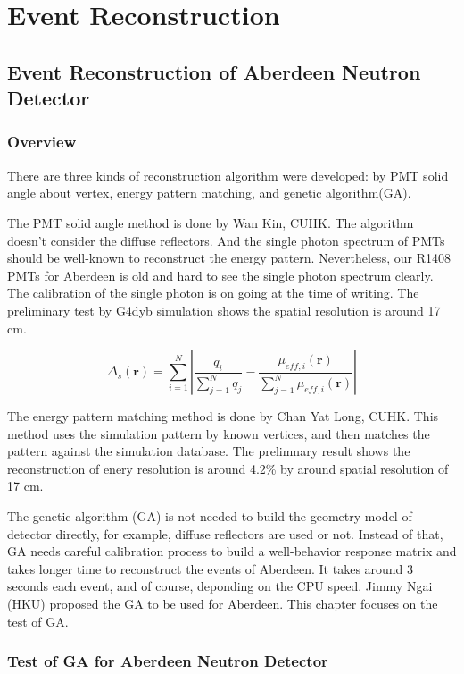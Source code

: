 \chapter {Event Reconstruction}
\section {Event Reconstruction of Aberdeen Neutron Detector}
\subsection {Overview}
There are three kinds of reconstruction algorithm were developed: by PMT solid angle about vertex,
energy pattern matching, and genetic algorithm(GA).

The PMT solid angle method is done by Wan Kin, CUHK.
The algorithm doesn't consider the diffuse reflectors.
And the single photon spectrum of PMTs should be well-known to reconstruct the energy pattern.
Nevertheless, our R1408 PMTs for Aberdeen is old and hard to see the single photon spectrum clearly.
The calibration of the single photon is on going at the time of writing.
The preliminary test by G4dyb simulation shows the spatial resolution is around 17 cm.

\begin{equation}
\label{eq:reconstructionCM}
\Delta_{s}(\mathbf{r}) = {\sum}^N_{i=1} |   \frac{q_i}{\sum^N_{j=1}q_j}  -  \frac { \mu_{eff,i}(\mathbf{r}) }{ \sum^N_{j=1}\mu_{eff,i}(\mathbf{r}) }|
\end{equation}


The energy pattern matching method is done by Chan Yat Long, CUHK.
This method uses the simulation pattern by known vertices, and then matches the pattern against the simulation database.
The prelimnary result shows the reconstruction of enery resolution is around 4.2\% by around spatial resolution of 17 cm.




The genetic algorithm (GA) is not needed to build the geometry model of detector directly, for example,
diffuse reflectors are used or not. Instead of that, GA needs careful calibration process
to build a well-behavior response matrix and takes longer time to reconstruct
the events of Aberdeen. It takes around 3 seconds each event, and of course, deponding
on the CPU speed. Jimmy Ngai (HKU) proposed the GA to be used for Aberdeen.
This chapter focuses on the test of GA.

\subsection{Test of GA for Aberdeen Neutron Detector}

